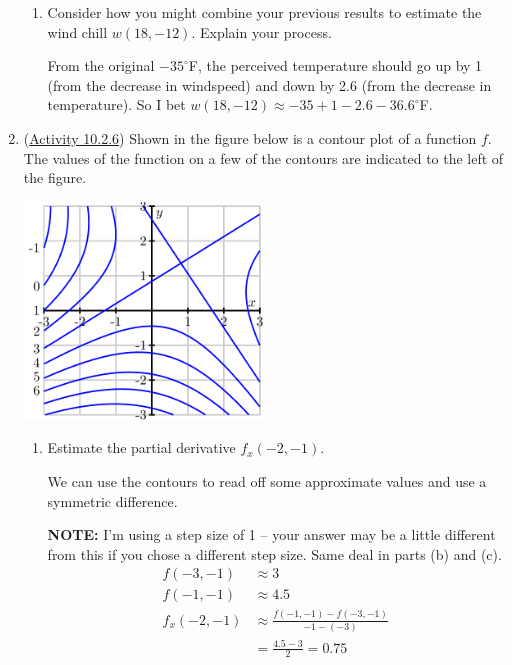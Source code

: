 \documentclass[10pt]{article}
\newenvironment{red}{\color{red}}{\ignorespacesafterend}
\begin{document}
\begin{enumerate}[leftmargin=0pt]
\begin{enumerate}
    \item Consider how you might combine your previous results to estimate the wind chill $w(18, -12)$. Explain your process.
    
    \begin{red}
    From the original $-35^\circ$F, the perceived temperature should go up by 1 (from the decrease in windspeed) and down by 2.6 (from the decrease in temperature). So I bet $w(18, -12) \approx -35 + 1 - 2.6 -36.6^\circ$F.
    \end{red}
\end{enumerate}
\item (\href{https://activecalculus.org/multi/S-10-2-First-Order-Partial-Derivatives.html#A_10_2_13}{Activity 10.2.6}) Shown in the figure below is a contour plot of a function $f$. The values of the function on a few of the contours are indicated to the left of the figure.
\begin{center}
    \includegraphics[width=0.5\textwidth]{../images/10-2-6.png}
\end{center}
\begin{enumerate}
    \item Estimate the partial derivative $f_x(-2, -1).$
    
    \begin{red}
    We can use the contours to read off some approximate values and use a symmetric difference. 
    
    \textbf{NOTE:} I'm using a step size of 1 -- your answer may be a little different from this if you chose a different step size. Same deal in parts (b) and (c).
    \begin{align*}
        f(-3, -1) &\approx 3 \\
        f(-1, -1) &\approx 4.5 \\
        f_x(-2,-1) &\approx 
        \frac{f(-1, -1)-f(-3, -1)}{-1-(-3)} \\
        &= \frac{4.5-3}{2} = 0.75
    \end{align*}
    \end{red}
    

\end{enumerate}
\end{enumerate}
\end{document}

